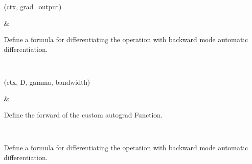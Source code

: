 \documentclass[letterpaper,10pt,english]{sphinxmanual}
\begin{document}
\begin{fulllineitems}
\begin{savenotes}
\begin{longtable}{}
\endlastfoot
\sphinxtableatstartofbodyhook
\begin{varwidth}[t]{}
\sphinxAtStartPar
{\hyperref[\detokenize{dtw_loss_functions.soft_dtw_implementations.soft_dtw_cuda_ron.autograd:dtw_loss_functions.soft_dtw_implementations.soft_dtw_cuda_ron.autograd.SoftDTWAutograd.backward}]{}}(ctx, grad\_output)
\sphinxbeforeendvarwidth
\end{varwidth}%
&\begin{varwidth}[t]{}
\sphinxAtStartPar
Define a formula for differentiating the operation with backward mode automatic differentiation.
\sphinxbeforeendvarwidth
\end{varwidth}%
\\
\sphinxhline\begin{varwidth}[t]{}
\sphinxAtStartPar
{\hyperref[\detokenize{dtw_loss_functions.soft_dtw_implementations.soft_dtw_cuda_ron.autograd:dtw_loss_functions.soft_dtw_implementations.soft_dtw_cuda_ron.autograd.SoftDTWAutograd.forward}]{}}(ctx, D, gamma, bandwidth)
\sphinxbeforeendvarwidth
\end{varwidth}%
&\begin{varwidth}[t]{}
\sphinxAtStartPar
Define the forward of the custom autograd Function.
\sphinxbeforeendvarwidth
\end{varwidth}%
\\
\sphinxbottomrule
\end{longtable}
\sphinxtableafterendhook
\sphinxatlongtableend
\end{savenotes}

\begin{fulllineitems}
\label{\detokenize{dtw_loss_functions.soft_dtw_implementations.soft_dtw_cuda_ron.autograd:dtw_loss_functions.soft_dtw_implementations.soft_dtw_cuda_ron.autograd.SoftDTWAutograd.backward}}
\pysigstartsignatures
\pysiglinewithargsret
{}
{\sphinxparamcomma {}}
{}
\pysigstopsignatures
\sphinxAtStartPar
Define a formula for differentiating the operation with backward mode automatic differentiation.


\end{fulllineitems}
\end{fulllineitems}
\end{document}
